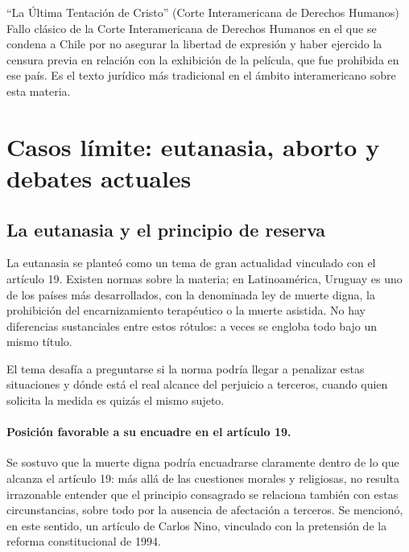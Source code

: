 \documentclass[12pt,oneside]{book}
\begin{document}
\begin{example}{``La Última Tentación de Cristo'' (Corte Interamericana de Derechos Humanos)}
Fallo clásico de la Corte Interamericana de Derechos Humanos en el que se condena a Chile por no asegurar la libertad de expresión y haber ejercido la censura previa en relación con la exhibición de la película, que fue prohibida en ese país. Es el texto jurídico más tradicional en el ámbito interamericano sobre esta materia.
\end{example}

\section{Casos límite: eutanasia, aborto y debates actuales}

\subsection{La eutanasia y el principio de reserva}

La eutanasia se planteó como un tema de gran actualidad vinculado con el artículo 19. Existen normas sobre la materia; en Latinoamérica, Uruguay es uno de los países más desarrollados, con la denominada ley de muerte digna, la prohibición del encarnizamiento terapéutico o la muerte asistida. No hay diferencias sustanciales entre estos rótulos: a veces se engloba todo bajo un mismo título.

El tema desafía a preguntarse si la norma podría llegar a penalizar estas situaciones y dónde está el real alcance del perjuicio a terceros, cuando quien solicita la medida es quizás el mismo sujeto.

\paragraph{Posición favorable a su encuadre en el artículo 19.} Se sostuvo que la muerte digna podría encuadrarse claramente dentro de lo que alcanza el artículo 19: más allá de las cuestiones morales y religiosas, no resulta irrazonable entender que el principio consagrado se relaciona también con estas circunstancias, sobre todo por la ausencia de afectación a terceros. Se mencionó, en este sentido, un artículo de Carlos Nino, vinculado con la pretensión de la reforma constitucional de 1994.
\end{document}
